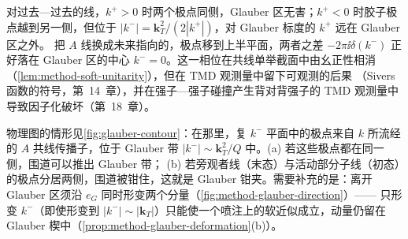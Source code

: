 \begin{example}[单胶子交换的极点图]\label{ex:method-glauber-oneloop}
对过去—过去的线，$k^+>0$ 时两个极点同侧，Glauber 区无害；$k^+<0$ 时胶子极点越到另一侧，但位于 $|k^-|=\mathbf k_T^2/(2|k^+|)$，对 Glauber 标度的 $k^+$ 远在 Glauber 区之外。
把 $A$ 线换成未来指向的，极点移到上半平面，两者之差 $-2\pi\ii\delta(k^-)$ 正好落在 Glauber 区的中心 $k^-=0$。这一相位在共线单举截面中由幺正性相消（\cref{lem:method-soft-unitarity}），但在 TMD 观测量中留下可观测的后果
（Sivers 函数的符号，第~14~章），并在强子—强子碰撞产生背对背强子的 TMD 观测量中导致因子化破坏（第~18~章）。

物理图的情形见\cref{fig:glauber-contour}：在那里，复 $k^-$ 平面中的极点来自 $k$ 所流经的 $A$ 共线传播子，位于 Glauber 带 $|k^-|\sim\mathbf k_T^2/Q$ 中。(a) 若这些极点都在同一侧，围道可以推出 Glauber 带；
(b) 若旁观者线（末态）与活动部分子线（初态）的极点分居两侧，围道被钳住，这就是 Glauber 钳夹。需要补充的是：离开 Glauber 区须沿 $e_G$ 同时形变两个分量（\cref{fig:method-glauber-direction}）——
只形变 $k^-$（即使形变到 $|k^-|\sim|\mathbf k_T|$）只能使一个喷注上的软近似成立，动量仍留在 Glauber 楔中（\cref{prop:method-glauber-deformation}(b)）。
\end{example}


